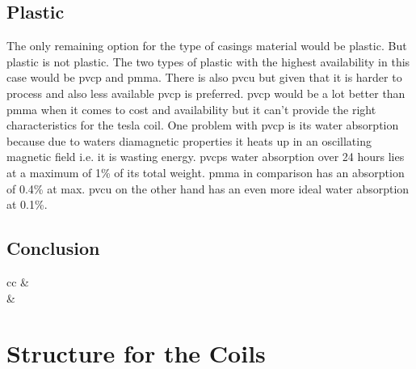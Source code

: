 \subsection{Plastic}

The only remaining option for the type of casings material would be plastic. But plastic is not plastic. The two types of plastic with the highest availability in this case would be \gls{pvcp} and \gls{pmma}. There is also \gls{pvcu} but given that it is harder to process and also less available \gls{pvcp} is preferred. \gls{pvcp} would be a lot better than \gls{pmma} when it comes to cost and availability but it can't provide the right characteristics for the tesla coil. One problem with \gls{pvcp} is its water absorption because due to waters diamagnetic properties it heats up in an oscillating magnetic field i.e. it is wasting energy. \gls{pvcp}s water absorption over 24 hours lies at a maximum of 1\% of its total weight. \gls{pmma} in comparison has an absorption of 0.4\% at max. \gls{pvcu} on the other hand has an even more ideal water absorption at 0.1\%.


\subsection{Conclusion}


\begin{tabular}[h!]{cc}
   &  \\
   &  \\
\end{tabular}

\section{Structure for the Coils}


